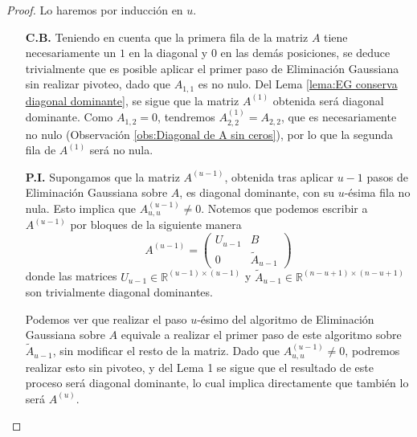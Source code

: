 \documentclass[11pt, a4paper, spanish]{article}
\theoremstyle{plain}
\theoremstyle{remark}
\begin{document}
      \begin{proof}
        Lo haremos por inducción en $u$. 
        \begin{itemize}
          \item[\textbf{C.B.}] Teniendo en cuenta que la primera fila de la matriz $A$ tiene necesariamente un $1$ en la diagonal y $0$ en las demás posiciones, se deduce trivialmente que es posible aplicar el primer paso de Eliminación Gaussiana sin realizar pivoteo, dado que $A_{1, 1}$ es no nulo. Del Lema \ref{lema:EG conserva diagonal dominante}, se sigue que la matriz $A^{(1)}$ obtenida será diagonal dominante. Como $A_{1, 2} = 0$, tendremos $A^{(1)}_{2,2} = A_{2,2}$, que es necesariamente no nulo (Observación \ref{obs:Diagonal de A sin ceros}), por lo que la segunda fila de $A^{(1)}$ será no nula.
              
          \item[\textbf{P.I.}] Supongamos que la matriz $A^{(u - 1)}$, obtenida tras aplicar $u - 1$ pasos de Eliminación Gaussiana sobre $A$, es diagonal dominante, con su $u$-ésima fila no nula. Esto implica que $A^{(u - 1)}_{u,u} \neq 0$. Notemos que podemos escribir a $A^{(u - 1)}$ por bloques de la siguiente manera
            \[ A^{(u - 1)} = \left( \begin{matrix} U_{u - 1} & B \\ 0 & \widetilde{A}_{u - 1} \end{matrix} \right) \]
          donde las matrices $U_{u - 1} \in \mathbb{R}^{(u-1)\times(u-1)}$ y $\widetilde{A}_{u - 1} \in \mathbb{R}^{(n-u+1)\times(n-u+1)}$ son trivialmente diagonal dominantes.

          Podemos ver que realizar el paso $u$-ésimo del algoritmo de Eliminación Gaussiana sobre $A$ equivale a realizar el primer paso de este algoritmo sobre $\widetilde{A}_{u - 1}$, sin modificar el resto de la matriz. Dado que $A^{(u - 1)}_{u,u} \neq 0$, podremos realizar esto sin pivoteo, y del Lema 1 se sigue que el resultado de este proceso será diagonal dominante, lo cual implica directamente que también lo será $A^{(u)}$.


\end{itemize}
\end{proof}
\end{document}
